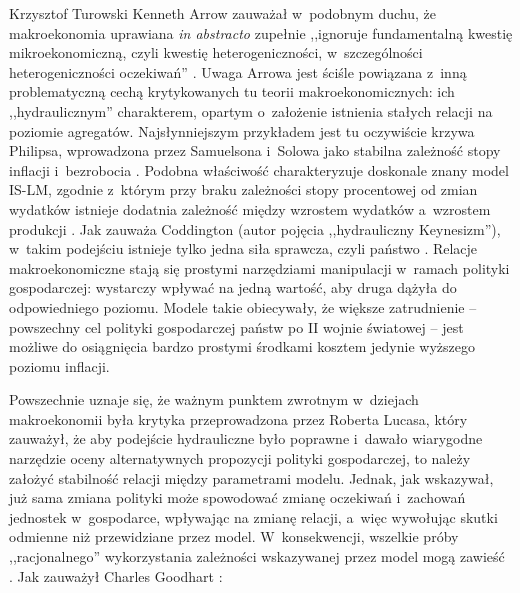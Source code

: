 \begin{artplenv}{Krzysztof Turowski}
Kenneth Arrow zauważał w~podobnym duchu, że makroekonomia uprawiana \textit{in abstracto} zupełnie ,,ignoruje
fundamentalną kwestię mikroekonomiczną, czyli kwestię heterogeniczności, w~szczególności heterogeniczności oczekiwań''
\parencite{colander_changing_2004}.
Uwaga Arrowa jest ściśle powiązana z~inną problematyczną cechą
krytykowanych tu teorii makroekonomicznych: ich ,,hydraulicznym'' charakterem, opartym o~założenie istnienia stałych
relacji na poziomie agregatów. Najsłynniejszym przykładem jest tu oczywiście krzywa Philipsa, wprowadzona przez
Samuelsona i~Solowa jako stabilna zależność stopy inflacji i~bezrobocia
\parencite{samuelson_analytical_1960}.
Podobna właściwość charakteryzuje doskonale znany model IS-LM, zgodnie z~którym przy braku zależności stopy
procentowej od zmian wydatków istnieje dodatnia zależność między wzrostem wydatków a~wzrostem produkcji
\parencite{hicks_mr._1937}.
Jak zauważa Coddington (autor pojęcia ,,hydrauliczny Keynesizm''), w~takim
podejściu istnieje tylko jedna siła sprawcza, czyli państwo
\parencite{coddington_keynesian_1976}.
Relacje
makroekonomiczne stają się prostymi narzędziami manipulacji w~ramach polityki gospodarczej: wystarczy wpływać na jedną
wartość, aby druga dążyła do odpowiedniego poziomu. Modele takie obiecywały, że większe zatrudnienie  -- 
powszechny cel polityki gospodarczej państw po II wojnie światowej
\parencite{robinson_second_1972}
 -- jest możliwe do osiągnięcia bardzo prostymi środkami kosztem jedynie wyższego poziomu inflacji.

Powszechnie uznaje się, że ważnym punktem zwrotnym w~dziejach makroekonomii była krytyka przeprowadzona przez Roberta
Lucasa, który zauważył, że aby podejście hydrauliczne było poprawne i~dawało wiarygodne narzędzie oceny alternatywnych
propozycji polityki gospodarczej, to należy założyć stabilność relacji między parametrami modelu. Jednak, jak
wskazywał, już sama zmiana polityki może spowodować zmianę oczekiwań i~zachowań jednostek w~gospodarce, wpływając na
zmianę relacji, a~więc wywołując skutki odmienne niż przewidziane przez model. W~konsekwencji, wszelkie próby
,,racjonalnego'' wykorzystania zależności wskazywanej przez model mogą zawieść
\parencite{lucas_econometric_1976}.
Jak zauważył Charles Goodhart
\parencite*[s.~116]{goodhart_problems_1984}:


\end{artplenv}
